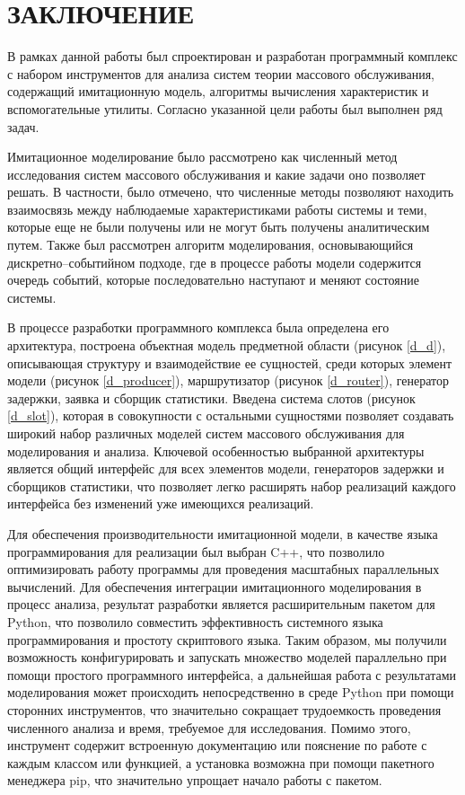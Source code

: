 \section*{\centering\normalsize ЗАКЛЮЧЕНИЕ}

В рамках данной работы был спроектирован и разработан программный комплекс с набором инструментов для анализа систем теории массового обслуживания, содержащий имитационную модель, алгоритмы вычисления характеристик и вспомогательные утилиты. Согласно указанной цели работы был выполнен ряд задач.

Имитационное моделирование было рассмотрено как численный метод исследования систем массового обслуживания и какие задачи оно позволяет решать. В частности, было отмечено, что численные методы позволяют находить взаимосвязь между наблюдаемые характеристиками работы системы и теми, которые еще не были получены или не могут быть получены аналитическим путем. Также был рассмотрен алгоритм моделирования, основывающийся дискретно--событийном подходе, где в процессе работы модели содержится очередь событий, которые последовательно наступают и меняют состояние системы. 

В процессе разработки программного комплекса была определена его архитектура, построена объектная модель предметной области (рисунок  \ref{d_d}), описывающая структуру и взаимодействие ее сущностей, среди которых элемент модели (рисунок \ref{d_producer}), маршрутизатор (рисунок \ref{d_router}), генератор задержки, заявка и сборщик статистики. Введена система слотов (рисунок \ref{d_slot}), которая в совокупности с остальными сущностями позволяет создавать широкий набор различных моделей систем массового обслуживания для моделирования и анализа. Ключевой особенностью выбранной архитектуры является общий интерфейс для всех элементов модели, генераторов задержки и сборщиков статистики, что позволяет легко расширять набор реализаций каждого интерфейса без изменений уже имеющихся реализаций.

Для обеспечения производительности имитационной модели, в качестве языка программирования для реализации был выбран C++, что позволило оптимизировать работу программы для проведения масштабных параллельных вычислений. Для обеспечения интеграции имитационного моделирования в процесс анализа, результат разработки является расширительным пакетом для Python, что позволило совместить эффективность системного языка программирования и простоту скриптового языка. Таким образом, мы получили возможность конфигурировать и запускать множество моделей параллельно при помощи простого программного интерфейса, а дальнейшая работа с результатами моделирования может происходить непосредственно в среде Python при помощи сторонних инструментов, что значительно сокращает трудоемкость проведения численного анализа и время, требуемое для исследования. Помимо этого, инструмент содержит встроенную документацию или пояснение по работе с каждым классом или функцией, а установка возможна при помощи пакетного менеджера pip, что значительно упрощает начало работы с пакетом.

